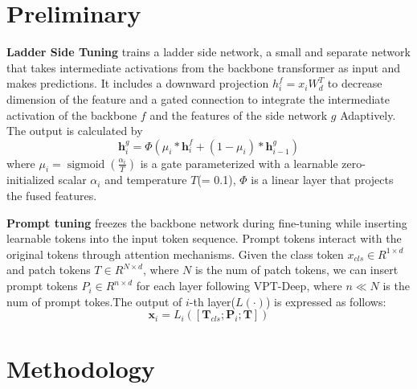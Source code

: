 \section{Preliminary}
\label{sec:preliminary}

\textbf{Ladder Side Tuning}\cite{sung2022lst} trains a ladder side network, a small and separate network that takes intermediate activations from the backbone transformer as input and makes predictions. It includes a downward projection $h_i^f=x_iW_d^T$ to decrease dimension of the feature and a gated connection to integrate the intermediate activation of the backbone $f$ and the features of the side network $g$ Adaptively. The output is calculated by
\begin{equation}
    \boldsymbol{h}_{i}^{g}=\Phi(\mu_{i} * \boldsymbol{h}_{i}^{f}+\left(1-\mu_{i}\right) * \boldsymbol{h}_{i-1}^{g})
\end{equation}
where $\mu_{i}=\operatorname{sigmoid}\left(\frac{\alpha_{i}}{T}\right)$ is a gate parameterized with a learnable zero-initialized scalar $\alpha_i$ and temperature $T$(= 0.1), $\Phi$ is a linear layer that projects the fused features.

\textbf{Prompt tuning}\cite{li2021prefix,jia2022visual} freezes the backbone network during fine-tuning while inserting learnable tokens into the input token sequence. Prompt tokens interact with the original tokens through attention mechanisms. Given the class token $x_{cls}\in R^{1 
\times d}$ and patch tokens $T \in R^{N \times d}$, where $N$ is the num of patch tokens, we can insert prompt tokens $P_i \in R^{n \times d}$ for each layer following VPT-Deep\cite{jia2022visual}, where $n \ll N$ is the num of prompt tokes.The output of $i$-th layer($L(\cdot)$) is expressed as follows:
\begin{equation}
    \boldsymbol{x}_{i}=L_{i}\left(\left[\boldsymbol{T}_{c l s} ; \boldsymbol{P}_{i} ; \boldsymbol{T}\right]\right)
\end{equation}



\section{Methodology}
\label{sec:methodology}



